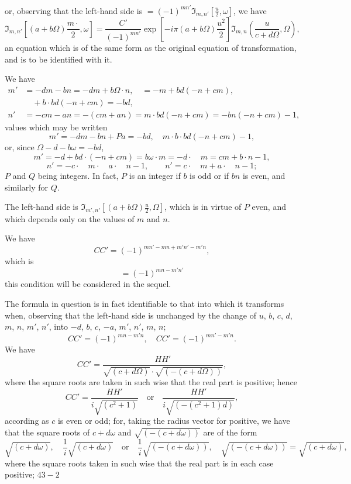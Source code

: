 \documentclass[11pt,a4paper]{book}
\begin{document}
\bigskip

\noindent or, observing that the left-hand side is $= (-1)^{mn'}\Im_{m,n'}\left[\frac{u}{2}, \omega\right]$, we have
\[
\Im_{m,n'}\left[(a + b\Omega)\frac{m\cdot}{2}, \omega\right] = \frac{C'}{(-1)^{mn'}} \exp\left[-i\pi(a + b\Omega)\frac{u^2}{2}\right] \Im_{m,n}\left(\frac{u}{c + d\Omega}, \Omega\right),
\]
an equation which is of the same form as the original equation of transformation, and is to be identified with it.

We have
\begin{align*}
m' &= -dm - bn = -dm + b\Omega \cdot n, \quad = -m + bd(-n + cm), \\
&\quad + b \cdot bd(-n + cm) = -bd, \\
n' &= -cm - an = -(cm + an) = m \cdot bd(-n + cm) = -bn(-n + cm) - 1,
\end{align*}
values which may be written
\[
m' = -dm - bn + Pa = -bd, \quad m \cdot b \cdot bd(-n + cm) - 1,
\]
or, since $\Omega - d - b\omega = -bd$,
\[
m' = -d + bd \cdot (-n + cm) = b\omega \cdot m = -d \cdot \quad m = cm + b \cdot n - 1,
\]
\[
n' = -c \cdot \quad m \cdot \quad a \cdot \quad n - 1, \quad \quad n' = c \cdot \quad m + a \cdot \quad n - 1;
\]
$P$ and $Q$ being integers. In fact, $P$ is an integer if $b$ is odd or if $bn$ is even, and similarly for $Q$.

The left-hand side is $\Im_{m',n'}\left[(a + b\Omega)\frac{u}{2}, \Omega\right]$, which is in virtue of $P$ even, and which depends only on the values of $m$ and $n$.

We have
\[
CC' = (-1)^{mn'-mn+m'n'-m'n},
\]
which is
\[
= (-1)^{mn-m'n'}
\]
this condition will be considered in the sequel.

The formula in question is in fact identifiable to that into which it transforms when, observing that the left-hand side is unchanged by the change of $u$, $b$, $c$, $d$, $m$, $n$, $m'$, $n'$, into $-d$, $b$, $c$, $-a$, $m'$, $n'$, $m$, $n$;
\[
CC' = (-1)^{mn-m'n}, \quad CC' = (-1)^{mn'-m'n}.
\]
We have
\[
CC' = \frac{HH'}{\sqrt{(c + d\Omega)} \cdot \sqrt{(-(c + d\Omega))}},
\]
where the square roots are taken in such wise that the real part is positive; hence
\[
CC' = \frac{HH'}{i\sqrt{(c^2 + 1)}} \quad \text{or} \quad \frac{HH'}{i\sqrt{(-(c^2 + 1)d)}},
\]
according as $c$ is even or odd; for, taking the radius vector for positive, we have that the square roots of $c + d\omega$ and $\sqrt{(-(c + d\omega))}$ are of the form
\[
\sqrt{(c + d\omega)}, \quad \frac{1}{i}\sqrt{(c + d\omega)} \quad \text{or} \quad \frac{1}{i}\sqrt{(-(c + d\omega))}, \quad \sqrt{(-(c + d\omega))} = \sqrt{(c + d\omega)},
\]
where the square roots taken in such wise that the real part is in each case positive;
\hfill $43-2$
\end{document}

